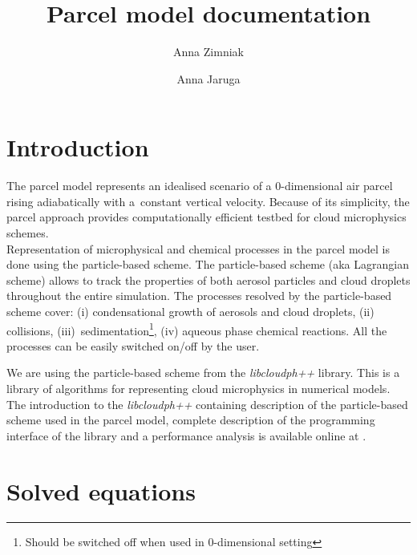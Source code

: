 \documentclass[11pt]{article}
\author{Anna Zimniak}
\author{Anna Jaruga}
\affil{Institute of Geophysics, Faculty of Physics, University of Warsaw, Poland}
\title{Parcel model documentation}
\begin{document}
\maketitle
\vspace{-4em}


\section{Introduction}\label{sec:intro}

The parcel model represents an idealised scenario of a 0-dimensional air parcel rising adiabatically with a~constant vertical velocity. 
Because of its simplicity, the parcel approach provides computationally efficient testbed for cloud microphysics schemes.\\

Representation of microphysical and chemical processes in the parcel model is done using the particle-based scheme.
The particle-based scheme (aka Lagrangian scheme) allows to track the properties of both 
  aerosol particles and cloud droplets throughout the entire simulation.
The processes resolved by the particle-based scheme cover:
  (i) condensational growth of aerosols and cloud droplets,
  (ii) collisions,
  (iii)~sedimentation\footnote{Should be switched off when used in 0-dimensional setting},
  (iv) aqueous phase chemical reactions.
All the processes can be easily switched on/off by the user.

We are using the particle-based scheme from the \emph{libcloudph++} library. This is a library of algorithms for representing cloud microphysics in numerical models.
The introduction to the \emph{libcloudph++} containing description of the particle-based scheme used in the parcel model, 
  complete description of the programming interface of the library and a performance analysis
  is available online at \cite{Arabas_et_al_2015}.

\section{Solved equations}\label{sec:eqs}
\end{document}
